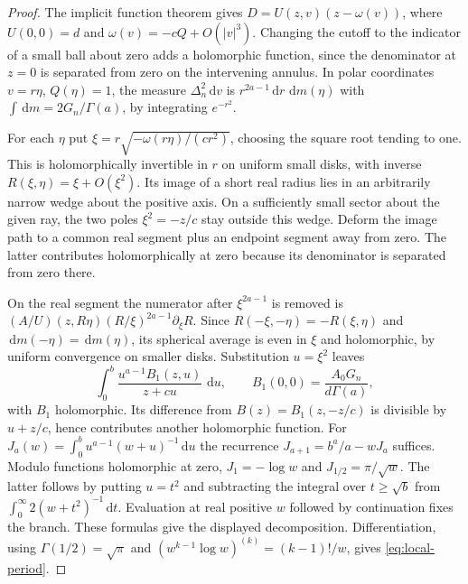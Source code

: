 \documentclass[11pt]{article}
\numberwithin{equation}{section}
\theoremstyle{definition}
\newcommand{\dd}{\,\mathrm d}
\begin{document}
\begin{proof}
The implicit function theorem gives
$D=U(z,v)(z-\omega(v))$, where $U(0,0)=d$ and
$\omega(v)=-cQ+O(|v|^3)$. Changing the cutoff to the indicator of
a small ball about zero adds a holomorphic function, since the
denominator at $z=0$ is separated from zero on the intervening annulus.
In polar coordinates $v=r\eta$, $Q(\eta)=1$, the measure
$\Delta_n^2\dd v$ is $r^{2a-1}\dd r\,\dd m(\eta)$ with
$\int\dd m=2G_n/\Gamma(a)$, by integrating $e^{-r^2}$.

For each $\eta$ put $\xi=r\sqrt{-\omega(r\eta)/(cr^2)}$, choosing
the square root tending to one. This is holomorphically invertible
in $r$ on uniform small disks, with inverse $R(\xi,\eta)=\xi+O(\xi^2)$.
Its image of a short real radius lies in an arbitrarily narrow wedge
about the positive axis. On a sufficiently small sector about the
given ray, the two poles $\xi^2=-z/c$ stay outside this wedge.
Deform the image path to a common real segment plus an endpoint
segment away from zero. The latter contributes holomorphically at
zero because its denominator is separated from zero there.

On the real segment the numerator after $\xi^{2a-1}$ is removed is
$(A/U)(z,R\eta)(R/\xi)^{2a-1}\partial_\xi R$. Since
$R(-\xi,-\eta)=-R(\xi,\eta)$ and $\dd m(-\eta)=\dd m(\eta)$,
its spherical average is even in $\xi$ and holomorphic, by uniform
convergence on smaller disks. Substitution $u=\xi^2$ leaves
\[
 \int_0^b \frac{u^{a-1}B_1(z,u)}{z+cu}\,\dd u,\qquad
 B_1(0,0)=\frac{A_0G_n}{d\Gamma(a)},
\]
with $B_1$ holomorphic. Its difference from $B(z)=B_1(z,-z/c)$
is divisible by $u+z/c$, hence contributes another holomorphic
function. For $J_a(w)=\int_0^b u^{a-1}(w+u)^{-1}\dd u$ the
recurrence $J_{a+1}=b^a/a-wJ_a$ suffices. Modulo functions
holomorphic at zero, $J_1=-\log w$ and $J_{1/2}=\pi/\sqrt w$.
The latter follows by putting $u=t^2$ and subtracting the integral
over $t\ge\sqrt b$ from $\int_0^\infty2(w+t^2)^{-1}\dd t$.
Evaluation at real positive $w$ followed by continuation fixes the
branch. These formulas give the displayed decomposition.
Differentiation, using $\Gamma(1/2)=\sqrt\pi$ and
$(w^{k-1}\log w)^{(k)}=(k-1)!/w$, gives \eqref{eq:local-period}.
\end{proof}
\end{document}
